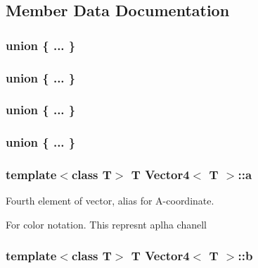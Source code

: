 \subsection{Member Data Documentation}
\hypertarget{class_vector4_a687a777e033b4aeb36745512a285ab15}{
\subsubsection[{"@11}]{\setlength{\rightskip}{0pt plus 5cm}union \{ ... \} }}
\label{class_vector4_a687a777e033b4aeb36745512a285ab15}
\hypertarget{class_vector4_a7c73c2be47abaf5d0e688cc2e09d2a74}{
\subsubsection[{"@13}]{\setlength{\rightskip}{0pt plus 5cm}union \{ ... \} }}
\label{class_vector4_a7c73c2be47abaf5d0e688cc2e09d2a74}
\hypertarget{class_vector4_a7bed48fe8a1f4f4f603ee8124ace6374}{
\subsubsection[{"@15}]{\setlength{\rightskip}{0pt plus 5cm}union \{ ... \} }}
\label{class_vector4_a7bed48fe8a1f4f4f603ee8124ace6374}
\hypertarget{class_vector4_ad6edebc0c1fcc9d21489d1a12fa47ccf}{
\subsubsection[{"@17}]{\setlength{\rightskip}{0pt plus 5cm}union \{ ... \} }}
\label{class_vector4_ad6edebc0c1fcc9d21489d1a12fa47ccf}
\hypertarget{class_vector4_a32a0b541c80b0eb5c2c08634b7ab4e3b}{
\subsubsection[{a}]{\setlength{\rightskip}{0pt plus 5cm}template$<$class T$>$ T {\bf Vector4}$<$ T $>$::{\bf a}}}
\label{class_vector4_a32a0b541c80b0eb5c2c08634b7ab4e3b}


Fourth element of vector, alias for A-\/coordinate. 

For color notation. This represnt aplha chanell \hypertarget{class_vector4_a147df940f8e570124eb54226be07f28b}{
\subsubsection[{b}]{\setlength{\rightskip}{0pt plus 5cm}template$<$class T$>$ T {\bf Vector4}$<$ T $>$::{\bf b}}}
\label{class_vector4_a147df940f8e570124eb54226be07f28b}


